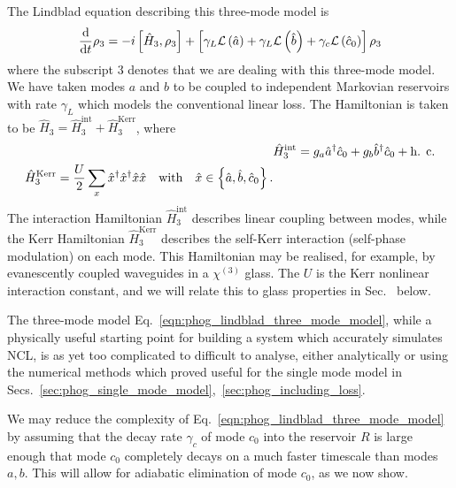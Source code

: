 The Lindblad equation describing this three-mode model is
\begin{equation}\label{eqn:phog_lindblad_three_mode_model}
\frac{\mathrm{d}}{\mathrm{d}t} \rho_3 = - i \left[ \hat{H}_3, \rho_3\right] + \left[ \gamma_L \mathcal{L}\left(\hat{a}\right) + \gamma_L \mathcal{L}\left(\hat{b}\right) + \gamma_c \mathcal{L}\left(\hat{c}_0\right)\right] \rho_3
\end{equation}
where the subscript $3$ denotes that we are dealing with this three-mode model. We have taken modes $a$ and $b$ to be coupled to independent Markovian reservoirs with rate $\gamma_L$ which models the conventional linear loss. The Hamiltonian is taken to be $\hat{H}_3 = \hat{H}_3^{\text{int}} + \hat{H}_3^{\text{Kerr}}$, where
\begin{align}
&\hat{H}_3^{\text{int}} = g_a \hat{a}^\dagger \hat{c}_0 + g_b \hat{b}^\dagger \hat{c}_0 + \hc \notag \\
%
\hat{H}_3^{\text{Kerr}} = \frac{U}{2} \sum_{x} \hat{x}^\dagger \hat{x}^\dagger \hat{x} \hat{x} \qq{with} \hat{x} \in \left\{\hat{a}, \hat{b}, \hat{c}_0\right\}.
\end{align}
The interaction Hamiltonian $\hat{H}_3^{\text{int}}$ describes linear coupling between modes, while the Kerr Hamiltonian $\hat{H}_3^{\text{Kerr}}$ describes the self-Kerr interaction (self-phase modulation)%
on each mode. This Hamiltonian may be realised, for example, by evanescently coupled waveguides in a $\chi^{\left(3\right)}$ glass. The $U$ is the Kerr nonlinear interaction constant, and we will relate this to glass properties in Sec.~ below.

The three-mode model Eq.~\ref{eqn:phog_lindblad_three_mode_model}, while a physically useful starting point for building a system which accurately simulates NCL, is as yet too complicated to difficult to analyse, either analytically or using the numerical methods which proved useful for the single mode model in Secs.~\ref{sec:phog_single_mode_model},~\ref{sec:phog_including_loss}. 

We may reduce the complexity of Eq.~\ref{eqn:phog_lindblad_three_mode_model} by assuming that the decay rate $\gamma_c$ of mode $c_0$ into the reservoir $R$ is large enough that mode $c_0$ completely decays on a much faster timescale than modes $a, b$. This will allow for adiabatic elimination of mode $c_0$, as we now show.


